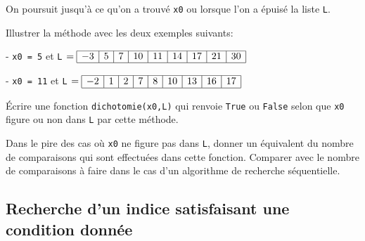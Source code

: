 On poursuit jusqu'à ce qu'on a trouvé \texttt{x0} ou lorsque l'on a épuisé la liste \texttt{L}.



\be\q Illustrer la méthode avec les deux exemples suivants:


-   \texttt{x0 = 5} et \texttt{L} $= \begin{array}{|c|c|c|c|c|c|c|c|c|} 
\hline -3 & 5 & 7 & 10 & 11 & 14 & 17 & 21 & 30 \\ \hline
\end{array}$


\medskip 

- \texttt{x0 = 11} et \texttt{L} $= \begin{array}{|c|c|c|c|c|c|c|c|c|} 
\hline -2 & 1 & 2 & 7 & 8 & 10 & 13 & 16 & 17  \\ \hline
\end{array}$




\q \'Ecrire une fonction \texttt{dichotomie(x0,L)} qui renvoie \texttt{True} ou \texttt{False} selon que \texttt{x0} figure ou non dans \texttt{L} par cette méthode.

\q Dans le pire des cas où \texttt{x0} ne figure pas dans \texttt{L}, donner un équivalent du nombre de comparaisons qui sont effectuées dans cette fonction. Comparer avec le nombre de comparaisons à faire dans le cas d'un algorithme de recherche séquentielle.

\ee

\subsection{Recherche d'un indice satisfaisant une condition donnée}

